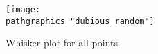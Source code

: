 \begin{figure}[t]
	\texttt{[image: \\pathgraphics "dubious random"]}
	\caption[Whisker plot for all points]{Whisker plot for all points.}
	\label{fig:dubious random}
\end{figure}

\endinput  %